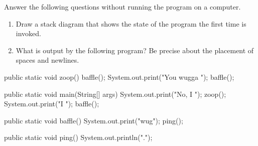 \begin{exercise}  %

Answer the following questions without running the program on a computer.

\begin{enumerate}

\item Draw a stack diagram that shows the state of the program the first time  is invoked.

\item What is output by the following program?
Be precise about the placement of spaces and newlines.



\end{enumerate}

\begin{code}
public static void zoop() {
    baffle();
    System.out.print("You wugga ");
    baffle();
}
\end{code}

\begin{code}
public static void main(String[] args) {
    System.out.print("No, I ");
    zoop();
    System.out.print("I ");
    baffle();
}
\end{code}

\begin{code}
public static void baffle() {
    System.out.print("wug");
    ping();
}
\end{code}

\begin{code}
public static void ping() {
    System.out.println(".");
}
\end{code}

\end{exercise}


